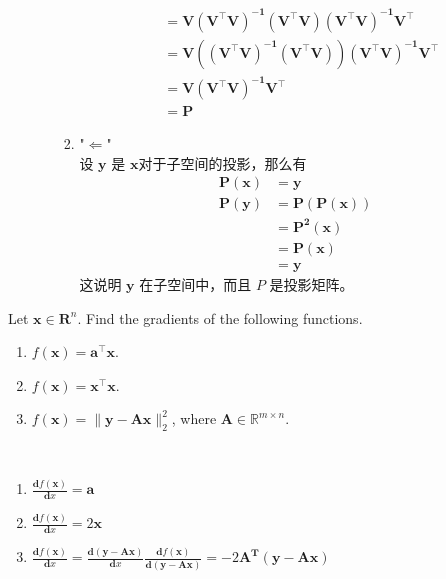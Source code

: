 \documentclass[11pt,letter,notitlepage]{article}
\begin{document}
\begin{solution}
\begin{enumerate}
\begin{enumerate}
\begin{enumerate}
\begin{align*}
					& = \mathbf{V(V^{\top}V)^{-1}(V^{\top}V)(V^{\top}V)^{-1}V^{\top}}\\
					& = \mathbf{V((V^{\top}V)^{-1}(V^{\top}V))(V^{\top}V)^{-1}V^{\top}}\\
					& = \mathbf{V(V^{\top}V)^{-1}V^{\top}}\\
					& = \mathbf{P}
				\end{align*}
				\item "$\Leftarrow$" \\
				设 $\mathbf{y}$ 是 $\mathbf{x}$对于子空间的投影，那么有 
				\begin{align*}
					\mathbf{P(x)} & =\mathbf{y}\\
					\mathbf{P(y)} & = \mathbf{P(P(x))}\\
					& = \mathbf{P^2(x)} \\
					& = \mathbf{P(x)}\\
					& = \mathbf{y}
				\end{align*}
				这说明 $\mathbf{y}$ 在子空间中，而且 $P$ 是投影矩阵。
					
			\end{enumerate}
		\end{enumerate}
	\end{enumerate}
\end{solution}

\newpage

\begin{exercise} 
	Let $\mathbf{x}\in \mathbf{R}^n$. Find the gradients of the following functions.
	\begin{enumerate}
	    \item $f(\mathbf{x}) = \mathbf{a}^{\top}\mathbf{x}$.
	    \item $f(\mathbf{x}) = \mathbf{x}^{\top}\mathbf{x}$.
	    \item $f(\mathbf{x})=\| \mathbf{y} - \mathbf{A}\mathbf{x} \|_2^2$, where $\mathbf{A}\in\mathbb{R}^{m\times n}$.
	\end{enumerate}
\end{exercise}

\begin{solution}
	\heiti
	\ \\
	\begin{enumerate}
		\item $\frac{\mathbf{d}f(\mathbf{x})}{\mathbf{d}x} = \mathbf{a}$
		\item $\frac{\mathbf{d}f(\mathbf{x})}{\mathbf{d}x} = 2\mathbf{x}$
		\item $\frac{\mathbf{d}f(\mathbf{x})}{\mathbf{d}x} =   \frac{\mathbf{d}(\mathbf{y} - \mathbf{A}\mathbf{x})}{\mathbf{d}x} \frac{\mathbf{d}f(\mathbf{x})}{\mathbf{d}(\mathbf{y} - \mathbf{A}\mathbf{x})} = - 2 \mathbf{A}^\mathbf{T} (\mathbf{y} - \mathbf{A}\mathbf{x})$
	\end{enumerate}
\end{solution}
\newpage
\end{document}
